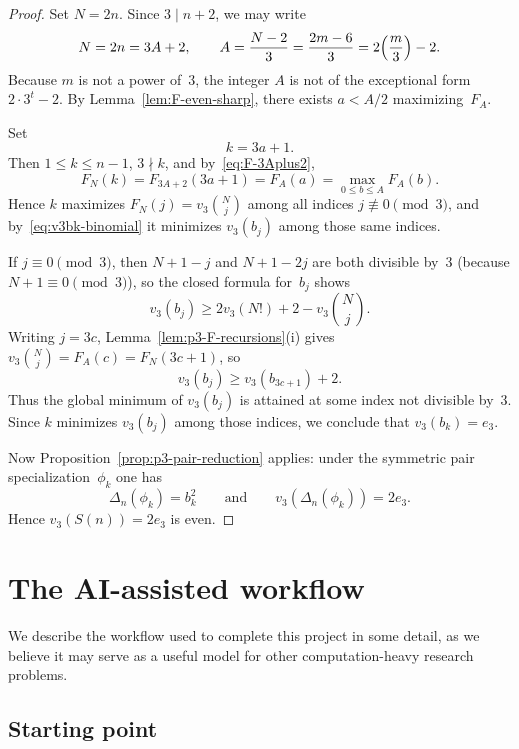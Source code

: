 \documentclass[10pt]{amsart}
\theoremstyle{definition}
\theoremstyle{remark}
\begin{document}
\begin{proof}
Set $N=2n$.  Since $3 \mid n+2$, we may write
\[
N = 2n = 3A+2,\qquad A = \frac{N-2}{3} = \frac{2m-6}{3}=2\Bigl(\frac{m}{3}\Bigr)-2.
\]
Because $m$ is not a power of~$3$, the integer $A$ is not of the
exceptional form $2\cdot 3^t - 2$.  By Lemma~\ref{lem:F-even-sharp},
there exists $a < A/2$ maximizing~$F_A$.

Set
\[
k = 3a+1.
\]
Then $1 \le k \le n-1$, $3 \nmid k$, and by~\eqref{eq:F-3Aplus2},
\[
F_N(k)=F_{3A+2}(3a+1)=F_A(a)
=
\max_{0 \le b \le A} F_A(b).
\]
Hence $k$ maximizes $F_N(j)=v_3\binom{N}{j}$ among all indices
$j \not\equiv 0 \pmod{3}$, and by~\eqref{eq:v3bk-binomial} it minimizes
$v_3(b_j)$ among those same indices.

If $j \equiv 0 \pmod{3}$, then $N+1-j$ and $N+1-2j$ are both divisible
by~$3$ (because $N+1 \equiv 0 \pmod{3}$), so the closed formula for~$b_j$
shows
\[
v_3(b_j)\ge 2v_3(N!)+2-v_3\binom{N}{j}.
\]
Writing $j=3c$, Lemma~\ref{lem:p3-F-recursions}(i) gives
$v_3\binom{N}{j}=F_A(c)=F_N(3c+1)$, so
\[
v_3(b_j)\ge v_3(b_{3c+1})+2.
\]
Thus the global minimum of $v_3(b_j)$ is attained at some index
not divisible by~$3$.  Since $k$ minimizes $v_3(b_j)$ among those indices,
we conclude that $v_3(b_k)=e_3$.

Now Proposition~\ref{prop:p3-pair-reduction} applies:
under the symmetric pair specialization~$\phi_k$ one has
\[
\Delta_n(\phi_k)=b_k^2
\qquad\text{and}\qquad
v_3(\Delta_n(\phi_k))=2e_3.
\]
Hence $v_3(S(n))=2e_3$ is even.
\end{proof}
\section{The AI-assisted workflow}\label{sec:ai}
We describe the workflow used to complete this project in some detail,
as we believe it may serve as a useful model for other computation-heavy
research problems.

\subsection*{Starting point}
\end{document}
